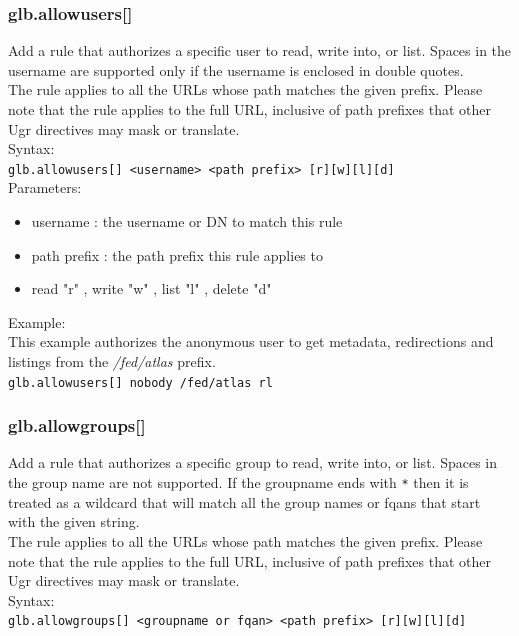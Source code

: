 \documentclass[12pt]{article} %
\begin{document}
\subsubsection{glb.allowusers[]}
Add a rule that authorizes a specific user to read, write into, or list. Spaces in the username are supported only if the username is enclosed in double quotes.\\
The rule applies to all the URLs whose path matches the given prefix. Please note that the rule applies to the full URL, inclusive of path prefixes that other Ugr directives may mask or translate.\\
Syntax:\\
\lstinline"glb.allowusers[] <username> <path prefix> [r][w][l][d]" \\

Parameters:\\
\begin{itemize}
 \item username : the username or DN to match this rule
 \item path prefix : the path prefix this rule applies to
 \item read "r" , write "w" , list "l" , delete "d"
\end{itemize}

Example:\\
This example authorizes the anonymous user to get metadata, redirections and listings from the \textit{/fed/atlas} prefix.\\
\lstinline"glb.allowusers[] nobody /fed/atlas rl" \\

\subsubsection{glb.allowgroups[]}
Add a rule that authorizes a specific group to read, write into, or list. Spaces in the group name are not supported.
If the groupname ends with \lstinline"*" then it is treated as a wildcard that will match all the group names or fqans that start with the given string.\\
The rule applies to all the URLs whose path matches the given prefix. Please note that the rule applies to the full URL, inclusive of path prefixes that other Ugr directives may mask or translate.\\
Syntax:\\
\lstinline"glb.allowgroups[] <groupname or fqan> <path prefix> [r][w][l][d]" \\
\end{document}
